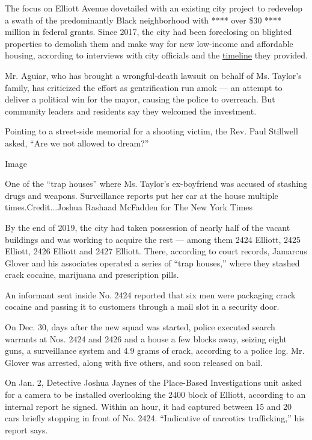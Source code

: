 The focus on Elliott Avenue dovetailed with an existing city project to
redevelop a swath of the predominantly Black neighborhood with **** over
\$30 **** million in federal grants. Since 2017, the city had been
foreclosing on blighted properties to demolish them and make way for new
low-income and affordable housing, according to interviews with city
officials and the
\href{https://louisvilleky.gov/sites/default/files/mayors_office/news_images/elliott_ave_project_timeline_2020.pdf}{timeline}
they provided.

Mr. Aguiar, who has brought a wrongful-death lawsuit on behalf of Ms.
Taylor's family, has criticized the effort as gentrification run amok
--- an attempt to deliver a political win for the mayor, causing the
police to overreach. But community leaders and residents say they
welcomed the investment.

Pointing to a street-side memorial for a shooting victim, the Rev. Paul
Stillwell asked, ``Are we not allowed to dream?''

Image

One of the ``trap houses'' where Ms. Taylor's ex-boyfriend was accused
of stashing drugs and weapons. Surveillance reports put her car at the
house multiple times.Credit...Joshua Rashaad McFadden for The New York
Times

By the end of 2019, the city had taken possession of nearly half of the
vacant buildings and was working to acquire the rest --- among them 2424
Elliott, 2425 Elliott, 2426 Elliott and 2427 Elliott. There, according
to court records, Jamarcus Glover and his associates operated a series
of ``trap houses,'' where they stashed crack cocaine, marijuana and
prescription pills.

An informant sent inside No. 2424 reported that six men were packaging
crack cocaine and passing it to customers through a mail slot in a
security door.

On Dec. 30, days after the new squad was started, police executed search
warrants at Nos. 2424 and 2426 and a house a few blocks away, seizing
eight guns, a surveillance system and 4.9 grams of crack, according to a
police log. Mr. Glover was arrested, along with five others, and soon
released on bail.

On Jan. 2, Detective Joshua Jaynes of the Place-Based Investigations
unit asked for a camera to be installed overlooking the 2400 block of
Elliott, according to an internal report he signed. Within an hour, it
had captured between 15 and 20 cars briefly stopping in front of No.
2424. ``Indicative of narcotics trafficking,'' his report says.

